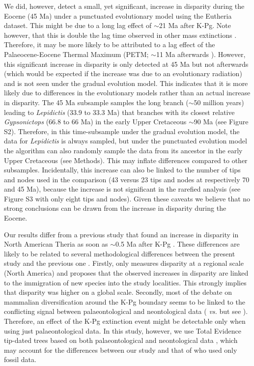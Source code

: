 \documentclass[10pt,letterpaper]{article}
\begin{document}
We did, however, detect a small, yet significant, increase in disparity during the Eocene (45 Ma) under a punctuated evolutionary model using the Eutheria dataset.
This might be due to a long lag effect of $\sim$21 Ma after K-Pg.
Note however, that this is double the lag time observed in other mass extinctions \cite{chen2012timing}.
Therefore, it may be more likely to be attributed to a lag effect of the Palaeocene-Eocene Thermal Maximum (PETM; $\sim$11 Ma afterwards \cite{bininda2007delayed}).
However, this significant increase in disparity is only detected at 45 Ma but not afterwards (which would be expected if the increase was due to an evolutionary radiation) and is not seen under the gradual evolution model.
This indicates that it is more likely due to differences in the evolutionary models rather than an actual increase in disparity.
The 45 Ma subsample samples the long branch ($\sim$50 million years) leading to \textit{Lepidictis} (33.9 to 33.3 Ma) that branches with its closest relative \textit{Gypsonictops} (66.8 to 66 Ma) in the early Upper Cretaceous $\sim$90 Ma (see Figure S2).
Therefore, in this time-subsample under the gradual evolution model, the data for \textit{Lepidictis} is always sampled, but under the punctuated evolution model the algorithm can also randomly sample the data from its ancestor in the early Upper Cretaceous (see Methods).
This may inflate differences compared to other subsamples.
Incidentally, this increase can also be linked to the number of tips and nodes used in the comparison (43 versus 23 tips and nodes at respectively 70 and 45 Ma), because the increase is not significant in the rarefied analysis (see Figure S3 with only eight tips and nodes).
Given these caveats we believe that no strong conclusions can be drawn from the increase in disparity during the Eocene.

Our results differ from a previous study that found an increase in disparity in North American Theria as soon as $\sim$0.5 Ma after K-Pg \cite{Wilson2013}.
These differences are likely to be related to several methodological differences between the present study and the previous one \cite{Wilson2013}.
Firstly, \cite{Wilson2013} only measures disparity at a regional scale (North America) and proposes that the observed increases in disparity are linked to the immigration of new species into the study localities.
This strongly implies that disparity was higher on a global scale.
Secondly, most of the debate on mammalian diversification around the K-Pg boundary seems to be linked to the conflicting signal between palaeontological and neontological data (\cite{meredithimpacts2011} \textit{vs.} \cite{OLeary08022013} but see \cite{dosReis2014}).
Therefore, an effect of the K-Pg extinction event might be detectable only when using just palaeontological data.
In this study, however, we use Total Evidence tip-dated trees based on both palaeontological and neontological data \cite{Slater2012MEE,beckancient2014}, which may account for the differences between our study and that of \cite{Wilson2013} who used only fossil data.
\end{document}
